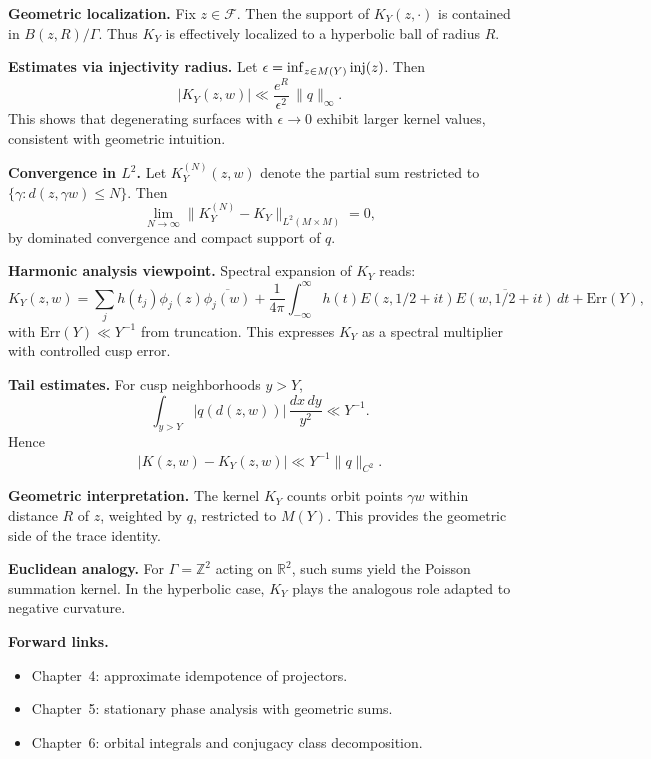 \medskip

\noindent\textbf{Geometric localization.}
Fix $z\in\mathcal{F}$.
Then the support of $K_{Y}(z,\cdot)$ is contained in $B(z,R)/\Gamma$.
Thus $K_{Y}$ is effectively localized to a hyperbolic ball of radius $R$.

\medskip

\noindent\textbf{Estimates via injectivity radius.}
Let $\epsilon=\inf_{z\in M(Y)}\operatorname{inj}(z)$.
Then
\[
  |K_{Y}(z,w)| \ll \frac{e^{R}}{\epsilon^{2}}\,\|q\|_{\infty}.
\]
This shows that degenerating surfaces with $\epsilon\to 0$
exhibit larger kernel values,
consistent with geometric intuition.

\medskip

\noindent\textbf{Convergence in $L^{2}$.}
Let $K_{Y}^{(N)}(z,w)$ denote the partial sum
restricted to $\{\gamma: d(z,\gamma w)\le N\}$.
Then
\[
  \lim_{N\to\infty} \|K_{Y}^{(N)}-K_{Y}\|_{L^{2}(M\times M)} = 0,
\]
by dominated convergence and compact support of $q$.

\medskip

\noindent\textbf{Harmonic analysis viewpoint.}
Spectral expansion of $K_{Y}$ reads:
\[
  K_{Y}(z,w) = \sum_{j} h(t_{j}) \phi_{j}(z)\overline{\phi_{j}(w)}
  + \frac{1}{4\pi}\int_{-\infty}^{\infty} h(t) E(z,1/2+it)\overline{E(w,1/2+it)}\,dt
  + \mathrm{Err}(Y),
\]
with $\mathrm{Err}(Y)\ll Y^{-1}$ from truncation.
This expresses $K_{Y}$ as a spectral multiplier with controlled cusp error.

\medskip

\noindent\textbf{Tail estimates.}
For cusp neighborhoods $y>Y$,
\[
  \int_{y>Y} |q(d(z,w))|\,\frac{dx\,dy}{y^{2}} \ll Y^{-1}.
\]
Hence
\[
  |K(z,w)-K_{Y}(z,w)| \ll Y^{-1}\|q\|_{C^{2}}.
\]

\medskip

\noindent\textbf{Geometric interpretation.}
The kernel $K_{Y}$ counts orbit points $\gamma w$ within distance $R$ of $z$,
weighted by $q$,
restricted to $M(Y)$.
This provides the geometric side of the trace identity.

\medskip

\noindent\textbf{Euclidean analogy.}
For $\Gamma=\mathbb{Z}^{2}$ acting on $\mathbb{R}^{2}$,
such sums yield the Poisson summation kernel.
In the hyperbolic case,
$K_{Y}$ plays the analogous role adapted to negative curvature.

\medskip

\noindent\textbf{Forward links.}
\begin{itemize}
  \item Chapter~4: approximate idempotence of projectors. 
  \item Chapter~5: stationary phase analysis with geometric sums. 
  \item Chapter~6: orbital integrals and conjugacy class decomposition. 
\end{itemize}

